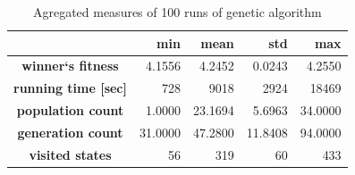 \documentclass[a4paper,jurnal]{IEEEtran}
\begin{document}
\begin{table}[h]
	\caption{Agregated measures of 100 runs of genetic algorithm}
	\centering
	\begin{tabular}{|c||r|r|r|r|}
		\hline
		\textbf{} &  \textbf{min} & \textbf{mean} & \textbf{std} &  \textbf{max} \\
		\hline
		\hline
		\textbf{winner`s fitness} & 4.1556 & 4.2452 & 0.0243 & 4.2550 \\ \hline
		\textbf{running time [sec]} & 728 & 9018 & 2924 & 18469 \\ \hline
		\textbf{population count} & 1.0000 & 23.1694 & 5.6963 & 34.0000 \\ \hline
		\textbf{generation count} & 31.0000 & 47.2800 & 11.8408 & 94.0000 \\ \hline
		\textbf{visited states} & 56 & 319 & 60 & 433 \\ \hline
	\end{tabular}
	\label{tbl:garesults}
\end{table}
\end{document}
